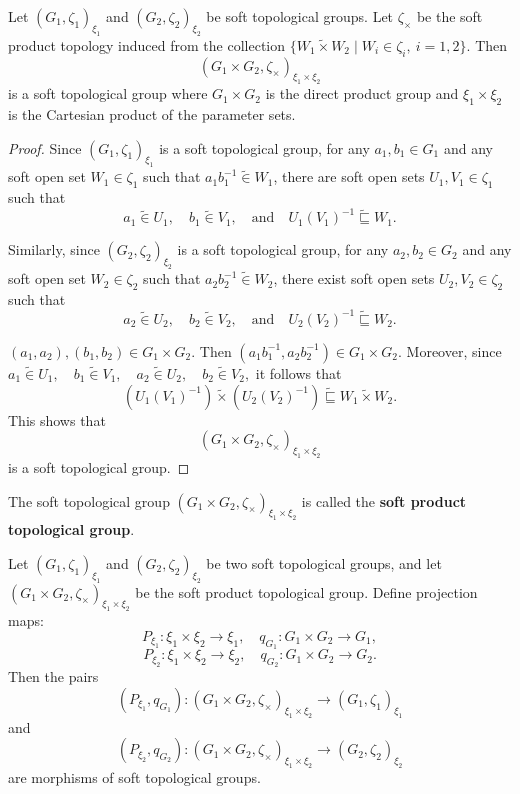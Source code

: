 \documentclass[preprint,12pt]{elsarticle}
\begin{document}
\begin{prop}
Let \( (G_1,\zeta_1 )_{\xi_1}  \) and \( (G_2,\zeta_2 )_{\xi_2}\) be soft topological groups.
Let \( \zeta_\times \) be the soft product topology induced from the collection \(\{ W_1 \widetilde{\times} W_2 \mid W_i \in \zeta_i,\ i = 1, 2\}.\)
Then
\[(G_1 \times G_2, \zeta_\times)_ {\xi_1 \times \xi_2}\]
is a soft topological group where \( G_1 \times G_2 \) is the direct product group and \( \xi_1 \times \xi_2 \) is the Cartesian product of the parameter sets.
\end{prop}
\begin{proof}
    Since  \(( G_1,\zeta_1 )_{\xi_1}  \) is a soft topological group, for any \( a_1, b_1 \in G_1 \) and any soft open set \( W_1 \in \zeta_1 \) such that \( a_1b_1^{-1}  \widetilde{\in}W_1 \),
there are soft open sets \( U_1, V_1 \in \zeta_1 \) such that
\[a_1  \widetilde{\in}U_1, \quad b_1  \widetilde{\in} V_1, \quad \text{and} \quad U_1 (V_1)^{-1}  \widetilde{\sqsubseteq}W_1.\]

Similarly, since \( (G_2,\zeta_2 )_{\xi_2}\) is a soft topological group,
for any \( a_2, b_2 \in G_2 \) and any soft open set \( W_2 \in \zeta_2 \) such that \( a_2 b_2^{-1}  \widetilde{\in}W_2 \),
there exist soft open sets \( U_2, V_2 \in \zeta_2 \) such that
\[a_2  \widetilde{\in}U_2, \quad b_2  \widetilde{\in}V_2, \quad \text{and} \quad U_2 (V_2)^{-1} \widetilde{\sqsubseteq }W_2.\]

\( (a_1, a_2), (b_1, b_2) \in G_1 \times G_2 \).
Then \( (a_1 b_1^{-1}, a_2 b_2^{-1}) \in G_1 \times G_2 \).
Moreover, since \(a_1 \widetilde{\in}U_1, \quad b_1  \widetilde{\in}V_1, \quad a_2  \widetilde{\in}U_2, \quad b_2  \widetilde{\in}V_2,\)
it follows that
\[(U_1 (V_1)^{-1}) \widetilde{\times} (U_2 (V_2)^{-1})  \widetilde{\sqsubseteq}W_1\widetilde{\times} W_2.\]
This shows that
\[
(G_1 \times G_2, \zeta_\times)_ {\xi_1 \times \xi_2}
\]
is a soft topological group.

\end{proof}
The soft topological group
$(G_1 \times G_2, \zeta_\times)_ {\xi_1 \times \xi_2}$
is called the \textbf{soft product topological group}.
\begin{thm}\label{projectionmap}
 Let \(( G_1,\zeta_1 )_{\xi_1}  \) and \( (G_2,\zeta_2 )_{\xi_2}\) be two soft topological groups,
and let $(G_1 \times G_2, \zeta_\times)_ {\xi_1 \times \xi_2}$
be the  soft product topological group. Define  projection maps:
\[P_{\xi_1} : \xi_1 \times \xi_2 \to \xi_1, \quad q_{G_1} : G_1 \times G_2 \to G_1,\]
\[P_{\xi_2} : \xi_1 \times \xi_2 \to \xi_2, \quad q_{G_2} : G_1 \times G_2 \to G_2.\]
Then the pairs
\[
(P_{\xi_1}, q_{G_1}) : (G_1 \times G_2, \zeta_\times)_ {\xi_1 \times \xi_2} \to (G_1,\zeta_1 )_{\xi_1}
\]
and
\[
(P_{\xi_2}, q_{G_2}) : (G_1 \times G_2, \zeta_\times)_ {\xi_1 \times \xi_2} \to  (G_2,\zeta_2 )_{\xi_2}
\]
are morphisms of soft topological groups.

\end{thm}
\end{document}
